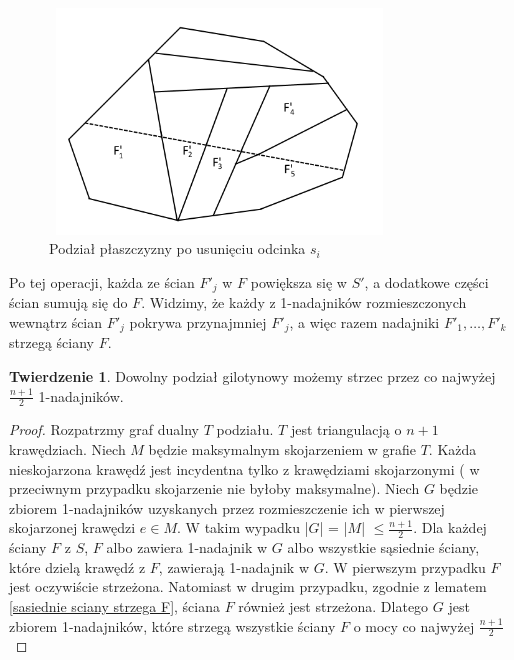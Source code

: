 \documentclass[brudnopis]{xmgr}
\theoremstyle{definition}
\newtheorem{Twierdzenie}{Twierdzenie}
\begin{document}
\begin{figure}[ht!]
  \centering
  \label{podzial po usunieciu si}
  \includegraphics[width=9cm,height=6cm]{rysunki/usuniete_si.png}
  \caption{Podział płaszczyzny po usunięciu odcinka $s_i$}
\end{figure} 

Po tej operacji, każda ze ścian $F'_j$ w $F$ powiększa się w $S'$, a dodatkowe części ścian sumują się do $F$. Widzimy, że każdy z 1-nadajników rozmieszczonych wewnątrz ścian $F'_j$ pokrywa przynajmniej $F'_j$, a więc razem nadajniki $F'_1,\ldots,F'_k$ strzegą ściany $F$.

\begin{Twierdzenie} \cite{knadajniki}
  Dowolny podział gilotynowy możemy strzec przez co najwyżej $\frac{n+1}{2}$ 1-nadajników.
\end{Twierdzenie}
\begin{proof}
	Rozpatrzmy graf dualny $T$ podziału. $T$ jest triangulacją o $n + 1$ krawędziach. Niech $M$ będzie maksymalnym skojarzeniem w grafie $T$. Każda nieskojarzona krawędź jest incydentna tylko z krawędziami skojarzonymi ( w przeciwnym przypadku skojarzenie nie byłoby maksymalne). Niech $G$ będzie zbiorem 1-nadajników uzyskanych przez rozmieszczenie ich w pierwszej skojarzonej krawędzi $e \in M$. W takim wypadku |$G$| = |$M$| $\le \frac{n+1}{2}$. Dla każdej ściany $F$ z $S$, $F$ albo zawiera 1-nadajnik w $G$ albo wszystkie sąsiednie ściany, które dzielą krawędź z $F$, zawierają 1-nadajnik w $G$. W pierwszym przypadku $F$ jest oczywiście strzeżona. Natomiast w drugim przypadku, zgodnie z lematem \ref{sasiednie sciany strzega F}, ściana $F$ również jest strzeżona. Dlatego $G$ jest zbiorem 1-nadajników, które strzegą wszystkie ściany $F$ o mocy co najwyżej $\frac{n+1}{2}$
\end{proof}
\end{document}
